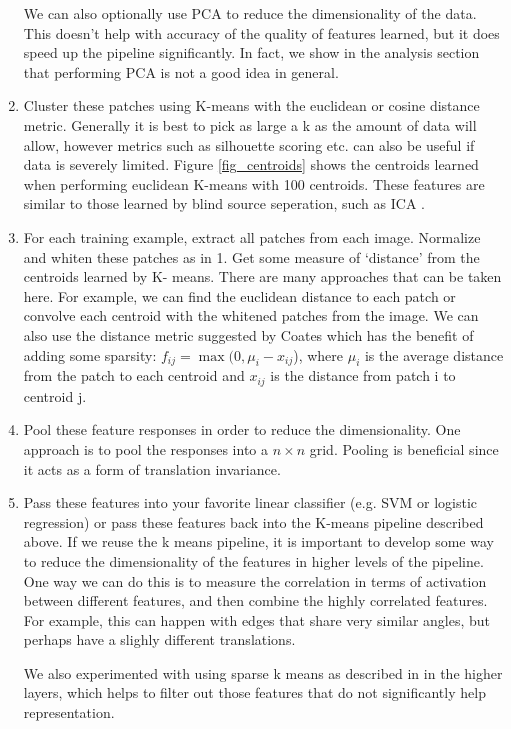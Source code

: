 \documentclass{article} %
\begin{document}
\begin{enumerate}
  We can also optionally use PCA to reduce the dimensionality of the data. This doesn’t help with accuracy of the quality of features learned, but it does speed up the pipeline significantly. In fact, we show in the analysis section that performing PCA is not a good idea in general.

\item Cluster these patches using K-means with the euclidean or cosine distance metric. Generally it is best to pick as large a k as the amount of data will allow, however metrics such as silhouette scoring etc. can also be useful if data is severely limited. Figure \ref{fig_centroids} shows the centroids learned when performing euclidean K-means with 100 centroids. These features are similar to those learned by blind source seperation, such as ICA \cite{hoyer}.

\item For each training example, extract all patches from each image. Normalize and whiten these patches as in 1. Get some measure of ‘distance’ from the centroids learned by K- means. There are many approaches that can be taken here. For example, we can find the euclidean distance to each patch or convolve each centroid with the whitened patches from the image. We can also use the distance metric suggested by Coates which has the benefit of adding some sparsity: $f_{ij} = \max(0, \mu_i - x_{ij}$), where $\mu_i$ is the average distance from the patch to each centroid and $x_{ij}$ is the distance from patch i to centroid j.

\item Pool these feature responses in order to reduce the dimensionality. One approach is to pool the responses into a $n \times n$ grid. Pooling is beneficial since it acts as a form of translation invariance.

\item Pass these features into your favorite linear classifier (e.g. SVM or logistic regression) or pass these features back into the K-means pipeline described above. If we reuse the k means pipeline, it is important to develop some way to reduce the dimensionality of the features in higher levels of the pipeline. One way we can do this is to measure the correlation in terms of activation between different features, and then combine the highly correlated features. For example, this can happen with edges that share very similar angles, but perhaps have a slighly different translations.

  We also experimented with using sparse k means as described in \cite{tibs10} in the higher layers, which helps to filter out those features that do not significantly help representation.
\end{enumerate}
\end{document}
